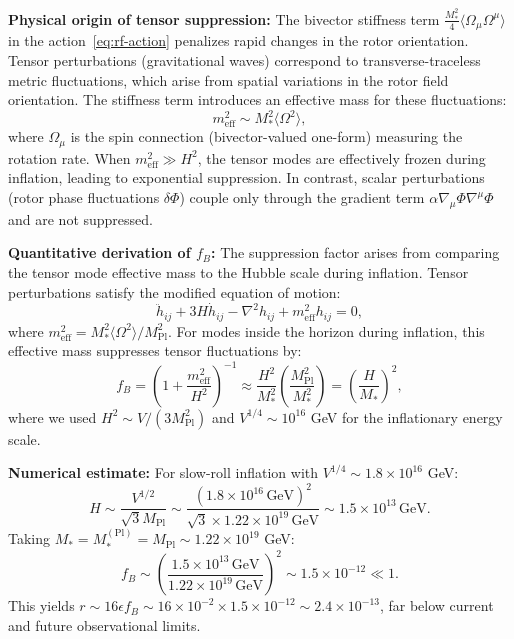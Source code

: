 \documentclass[11pt,a4paper]{article}
\numberwithin{equation}{section}
\theoremstyle{plain}
\theoremstyle{definition}
\theoremstyle{remark}
\begin{document}
\textbf{Physical origin of tensor suppression:} The bivector stiffness term $\frac{M_*^2}{4}\langle \Omega_\mu \Omega^\mu \rangle$ in the action~\eqref{eq:rf-action} penalizes rapid changes in the rotor orientation. Tensor perturbations (gravitational waves) correspond to transverse-traceless metric fluctuations, which arise from spatial variations in the rotor field orientation. The stiffness term introduces an effective mass for these fluctuations:
\begin{equation}
m_{\text{eff}}^2 \sim M_*^2 \langle \Omega^2 \rangle,
\end{equation}
where $\Omega_\mu$ is the spin connection (bivector-valued one-form) measuring the rotation rate. When $m_{\text{eff}}^2 \gg H^2$, the tensor modes are effectively frozen during inflation, leading to exponential suppression. In contrast, scalar perturbations (rotor phase fluctuations $\delta\Phi$) couple only through the gradient term $\alpha \nabla_\mu \Phi \nabla^\mu \Phi$ and are not suppressed.

\textbf{Quantitative derivation of $f_B$:} The suppression factor arises from comparing the tensor mode effective mass to the Hubble scale during inflation. Tensor perturbations satisfy the modified equation of motion:
\begin{equation}
\ddot{h}_{ij} + 3H\dot{h}_{ij} - \nabla^2 h_{ij} + m_{\text{eff}}^2 h_{ij} = 0,
\end{equation}
where $m_{\text{eff}}^2 = M_*^2 \langle \Omega^2 \rangle / M_{\mathrm{Pl}}^2$. For modes inside the horizon during inflation, this effective mass suppresses tensor fluctuations by:
\begin{equation}
f_B = \left(1 + \frac{m_{\text{eff}}^2}{H^2}\right)^{-1} \approx \frac{H^2}{M_*^2} \left(\frac{M_{\mathrm{Pl}}^2}{M_*^2}\right) = \left(\frac{H}{M_*}\right)^2,
\end{equation}
where we used $H^2 \sim V/(3M_{\mathrm{Pl}}^2)$ and $V^{1/4} \sim 10^{16}$ GeV for the inflationary energy scale.

\textbf{Numerical estimate:} For slow-roll inflation with $V^{1/4} \sim 1.8 \times 10^{16}$ GeV:
\begin{equation}
H \sim \frac{V^{1/2}}{\sqrt{3}M_{\mathrm{Pl}}} \sim \frac{(1.8\times 10^{16}\,\text{GeV})^2}{\sqrt{3}\times 1.22\times 10^{19}\,\text{GeV}} \sim 1.5 \times 10^{13}\,\text{GeV}.
\end{equation}
Taking $M_* = M_*^{(\text{Pl})} = M_{\mathrm{Pl}} \sim 1.22 \times 10^{19}$ GeV:
\begin{equation}
f_B \sim \left(\frac{1.5 \times 10^{13}\,\text{GeV}}{1.22 \times 10^{19}\,\text{GeV}}\right)^2 \sim 1.5 \times 10^{-12} \ll 1.
\end{equation}
This yields $r \sim 16\epsilon f_B \sim 16 \times 10^{-2} \times 1.5 \times 10^{-12} \sim 2.4 \times 10^{-13}$, far below current and future observational limits.
\end{document}
